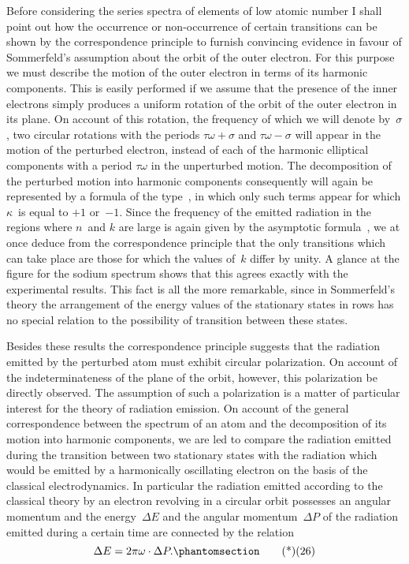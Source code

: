 Before considering the series spectra of elements of low atomic
number I shall point out how the occurrence or non-occurrence of
certain transitions can be shown by the correspondence principle
to furnish convincing evidence in favour of Sommerfeld's assumption
about the orbit of the outer electron. For this purpose we
must describe the motion of the outer electron in terms of its harmonic
components. This is easily performed if we assume that the
presence of the inner electrons simply produces a uniform rotation
of the orbit of the outer electron in its plane. On account of this
rotation, the frequency of which we will denote by~$\sigma$, two circular
rotations with the periods $\tau\omega + \sigma$ and $\tau\omega - \sigma$ will appear in the
motion of the perturbed electron, instead of each of the harmonic
elliptical components with a period $\tau\omega$ in the unperturbed motion.
The decomposition of the perturbed motion into harmonic components
consequently will again be represented by a formula of the
type~, in which only such terms appear for which $\kappa$~is equal
to $+1$ or~$-1$. Since the frequency of the emitted radiation in the
regions where $n$~and $k$ are large is again given by the asymptotic
formula~, we at once deduce from the correspondence principle
that the only transitions which can take place are those for which
the values of~$k$ differ by unity. A glance at the figure for the sodium
spectrum shows that this agrees exactly with the experimental
results. This fact is all the more remarkable, since in Sommerfeld's
theory the arrangement of the energy values of the stationary
states in rows has no special relation to the possibility of transition
between these states.

Besides these results the correspondence principle suggests
that the radiation emitted by the perturbed atom must
exhibit circular polarization. On account of the indeterminateness
of the plane of the orbit, however, this polarization  be
directly observed. The assumption of such a polarization is a matter
of particular interest for the theory of radiation emission. On
account of the general correspondence between the spectrum of
an atom and the decomposition of its motion into harmonic
components, we are led to compare the radiation emitted during
the transition between two stationary states with the radiation
which would be emitted by a harmonically oscillating
electron on the basis of the classical electrodynamics. In particular
the radiation emitted according to the classical theory
by an electron revolving in a circular orbit possesses an angular
momentum and the energy~$\Delta E$ and the angular momentum~$\Delta P$ of
the radiation emitted during a certain time are connected by the
relation
\[
\Delta E = 2\pi\omega \cdot \Delta P.
\Tag{(26)}
\]

